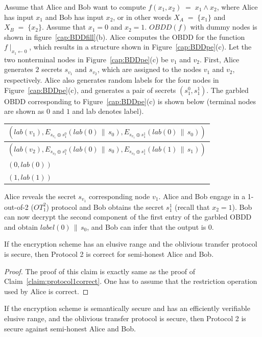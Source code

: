 \begin{example}
\label{example:protocol2}
\rm Assume that Alice and Bob want to compute $f(x_1,x_2)  \; = \; x_1 \wedge x_2$, where
Alice has input $x_1$ and Bob has input $x_2$, or in other words $X_A
\; = \; \{ x_1 \}$ and $X_B \; = \; \{ x_2 \}$.  Assume that $x_1 = 0$
and $x_2 = 1$. $OBDD(f)$ with dummy nodes is shown in
figure~\ref{cap:BDDfill}(b). Alice computes the OBDD for the function
$f \mid_{ x_1 \leftarrow 0}$, which results in a structure shown in
Figure~\ref{cap:BDDpe}(c).  Let the two nonterminal nodes in
Figure~\ref{cap:BDDpe}(c) be $v_1$ and $v_2$. First, Alice generates
$2$ secrets $s_{v_1}$ and  $s_{v_2}$, which are assigned
to the nodes $v_1$ and $v_2$, respectively.   Alice also
generates random labels for the four nodes in
Figure~\ref{cap:BDDpe}(c), and  generates a pair of secrets
$(s_1^0,s_1^1)$. The garbled OBDD corresponding to
Figure~\ref{cap:BDDpe}(c) is shown below (terminal nodes
are shown as $0$ and $1$ and lab denotes label). 
\begin{center}
\begin{tabular}{|l|} \hline
$(lab(v_1), E_{s_{v_1} \oplus s_1^0} (lab(0)  \,\|\, s_0), E_{s_{v_1} \oplus s_1^1} (lab(0) \,\|\, s_0))$ \\ \hline
$(lab(v_2), E_{s_{v_2} \oplus s_1^0} (lab(0) \,\|\, s_0), E_{s_{v_2} \oplus s_1^1} (lab(1) \,\|\, s_1))$ \\ \hline
$(0,lab(0))$ \\ \hline
$(1,lab(1))$ \\ \hline
\end{tabular}
\end{center}
Alice reveals the secret $s_{v_1}$ corresponding node $v_1$.
Alice and Bob engage in a 1-out-of-2 ($OT^2_1$) protocol and Bob obtains the secret $s_1^1$ (recall that
$x_2 = 1$).
Bob can now decrypt the second component of the first entry of the garbled OBDD and
obtain $label(0) \,\|\, s_0$, and  Bob can infer that the output is $0$.
\end{example}

\begin{claim} If the encryption scheme has an elusive range and the
oblivious transfer protocol is secure, then Protocol 2 is correct for
semi-honest Alice and Bob.
\label{claim:protocol2correct}
\end{claim}
\begin{proof}
The proof of this claim is exactly same as the proof of Claim~\ref{claim:protocol1correct}.
One has to assume that the restriction operation used by Alice is correct.
\end{proof}

\begin{claim} If the encryption scheme is semantically secure and has an
efficiently verifiable elusive range, and the oblivious transfer
protocol is secure, then Protocol 2 is secure against semi-honest
Alice and Bob.
\label{claim:protocol2secure}
\end{claim}

